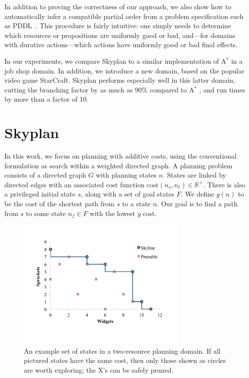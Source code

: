 \documentclass[letterpaper]{article}
\theoremstyle{plain} \newtheorem{theorem}{Theorem} \newtheorem{proposition}{Proposition} \newtheorem{lemma}{Lemma}
\theoremstyle{definition} \newtheorem{definition}{Definition} \newtheorem{conjecture}{Conjecture} \newtheorem*{example}{Example}
\theoremstyle{remark} \newtheorem*{remark}{Remark} \newtheorem*{note}{Note} \newtheorem{case}{Case}
\newcommand{\Astar}{A$^*$ }
\begin{document}
In addition to proving the correctness of our approach, we also
show how to automatically infer a compatible partial order from a problem
specification such as PDDL~\citep{ghallab1998pddl,fox2003pddl2}.
This procedure is fairly intuitive: one simply needs to determine
which resources or propositions are uniformly good or bad, and---for 
domains with durative actions---which actions have uniformly
good or bad final effects.

In our experiments, we compare Skyplan to a similar implementation
of \Astar in a job shop domain. In addition, we introduce a new
domain, based on the popular video game StarCraft. Skyplan performs
especially well in this latter domain, cutting the branching factor
by as much as 90\% compared to \Astar, and run times by more
than a factor of 10.

\section{Skyplan}


In this work, we focus on planning with additive
costs, using the conventional formulation as search within a weighted directed graph.  A planning problem
consists of a directed graph $G$ with planning states $n$. States are linked by directed edges with an associated
cost function $\mathrm{cost}(n_s,n_t) \in \mathbb R^+$.  There is
also a privileged initial state $s$, along with a set of goal states
$F$.  We define $g(n)$ to be the cost of the shortest path from $s$
to a state $n$.  Our goal is to find a path from $s$ to some state
$n_f \in F$ with the lowest $g$ cost.


\begin{figure}
	\begin{center}
	\includegraphics[width=3.3in]{skyline2d.pdf}
\end{center}
  \caption{An example set of states in a two-resource planning domain. If
all pictured states have the same cost, then only those shown as circles are
worth exploring; the X's can be safely pruned.}
  \label{fig:skyline}
\end{figure}
\end{document}
